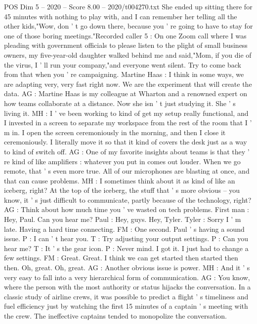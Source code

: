 \begin{textsample}{POS Dim 5 – 2020 – Score 8.00 – 2020/t004270.txt}
She ended up sitting there for 45 minutes with nothing to play with, and I can remember her telling all the other kids,"Wow, don ' t go down there, because you ' re going to have to stay for one of those boring meetings."Recorded caller 5 : On one Zoom call where I was pleading with government officials to please listen to the plight of small business owners, my five-year-old daughter walked behind me and said,"Mom, if you die of the virus, I ' ll run your company,"and everyone went silent.
Try to come back from that when you ' re campaigning.
Martine Haas : I think in some ways, we are adapting very, very fast right now.
We are the experiment that will create the data.
AG : Martine Haas is my colleague at Wharton and a renowned expert on how teams collaborate at a distance.
Now she isn ' t just studying it.
She ' s living it.
MH : I ' ve been working to kind of get my setup really functional, and I invested in a screen to separate my workspace from the rest of the room that I ' m in.
I open the screen ceremoniously in the morning, and then I close it ceremoniously.
I literally move it so that it kind of covers the desk just as a way to kind of switch off.
AG : One of my favorite insights about teams is that they ' re kind of like amplifiers : whatever you put in comes out louder.
When we go remote, that ' s even more true.
All of our microphones are blasting at once, and that can cause problems.
MH : I sometimes think about it as kind of like an iceberg, right?
At the top of the iceberg, the stuff that ' s more obvious -- you know, it ' s just difficult to communicate, partly because of the technology, right?
AG : Think about how much time you ' ve wasted on tech problems.
First man : Hey, Paul.
Can you hear me?
Paul : Hey, guys.
Hey, Tyler.
Tyler : Sorry I ' m late.
Having a hard time connecting.
FM : One second.
Paul ' s having a sound issue.
P : I can ' t hear you.
T : Try adjusting your output settings.
P : Can you hear me?
T : It ' s the gear icon.
P : Never mind.
I got it.
I just had to change a few settings.
FM : Great.
Great.
I think we can get started then started then then.
Oh, great.
Oh, great.
AG : Another obvious issue is power.
MH : And it ' s very easy to fall into a very hierarchical form of communication.
AG : You know, where the person with the most authority or status hijacks the conversation.
In a classic study of airline crews, it was possible to predict a flight ' s timeliness and fuel efficiency just by watching the first 15 minutes of a captain ' s meeting with the crew.
The ineffective captains tended to monopolize the conversation.

\end{textsample}
